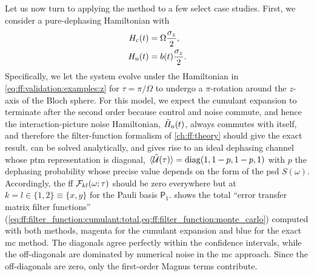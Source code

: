 Let us now turn to applying the method to a few select case studies.
First, we consider a pure-dephasing Hamiltonian with
\begin{equation}\label{eq:ff:validation:examples:z}
    \begin{split}
        H_{\mathrm{c}}(t) &= \Omega\frac{\sigma_z}{2}, \\
        H_{\mathrm{n}}(t) &= b(t)\frac{\sigma_z}{2}.
    \end{split}
\end{equation}
Specifically, we let the system evolve under the Hamiltonian in \cref{eq:ff:validation:examples:z} for $\tau = \pi/\Omega$ to undergo a $\pi$-rotation around the $z$-axis of the Bloch sphere.
For this model, we expect the cumulant expansion to terminate after the second order because control and noise commute, and hence the interaction-picture noise Hamiltonian, $\tilde{H}_{\mathrm{n}}(t)$, always commutes with itself, and therefore the filter-function formalism of \cref{ch:ff:theory} should give the exact result.
 can be solved analytically, and gives rise to an ideal dephasing channel whose \gls{ptm} representation is diagonal, $\liouvUetavg = \diag(1, 1-p, 1-p, 1)$ with $p$ the dephasing probability whose precise value depends on the form of the \gls{psd} $S(\omega)$.
Accordingly, the \gls{ff} $\mathcal{F}_{kl}(\omega;\tau)$ should be zero everywhere but at $k=l\in\{1, 2\}\equiv\{x, y\}$ for the Pauli basis $\mathsf{P}_1$.
 shows the total \enquote{error transfer matrix filter functions} (\cref{eq:ff:filter_function:cumulant:total,eq:ff:filter_function:monte_carlo}) computed with both methods, magenta for the cumulant expansion and blue for the exact \gls{mc} method.
The diagonals agree perfectly within the confidence intervals, while the off-diagonals are dominated by numerical noise in the \gls{mc} approach.
Since the off-diagonals are zero, only the first-order Magnus terms contribute.

